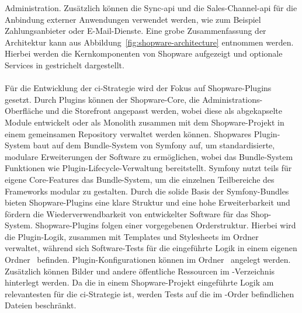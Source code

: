 Administration.
Zusätzlich können die Sync-\acrshort{api} und die Sales-Channel-\acrshort{api} für die Anbindung externer Anwendungen
verwendet werden, wie zum Beispiel Zahlungsanbieter oder E-Mail-Dienste.
Eine grobe Zusammenfassung der Architektur kann aus Abbildung\ \ref{fig:shopware-architecture} entnommen werden.
Hierbei werden die Kernkomponenten von Shopware aufgezeigt und optionale Services in gestrichelt dargestellt.
\\\\
Für die Entwicklung der \acrshort{ci}-Strategie wird der Fokus auf Shopware-Plugins gesetzt.
Durch Plugins können der Shopware-Core, die Administrations-Oberfläche und die Storefront angepasst werden, wobei diese
als abgekapselte Module entwickelt oder als Monolith zusammen mit dem Shopware-Projekt in einem gemeinsamen Repository
verwaltet werden können.
Shopwares Plugin-System baut auf dem Bundle-System von Symfony auf, um standardisierte, modulare Erweiterungen der
Software zu ermöglichen, wobei das Bundle-System Funktionen wie Plugin-Lifecycle-Verwaltung bereitstellt.
Symfony nutzt teils für eigene Core-Features das Bundle-System, um die einzelnen Teilbereiche des Frameworks modular zu
gestalten.
Durch die solide Basis der Symfony-Bundles bieten Shopware-Plugins eine klare Struktur und eine hohe Erweiterbarkeit
und fördern die Wiederverwendbarkeit von entwickelter Software für das Shop-System.
Shopware-Plugins folgen einer vorgegebenen Orderstruktur.
Hierbei wird die Plugin-Logik, zusammen mit Templates und Stylesheets im Ordner\  verwaltet,
während sich Software-Tests für die eingeführte Logik in einem eigenen Ordner\  befinden.
Plugin-Konfigurationen können im Ordner\  angelegt werden.
Zusätzlich können Bilder und andere öffentliche Ressourcen im -Verzeichnis hinterlegt werden.
Da die in einem Shopware-Projekt eingeführte Logik am relevantesten für die \acrshort{ci}-Strategie ist, werden Tests
auf die im -Order befindlichen Dateien beschränkt.

\clearpage
